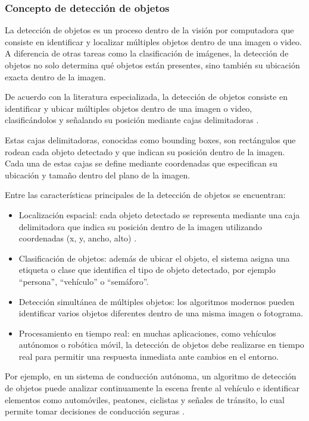 \subsubsection{Concepto de detección de objetos}
La detección de objetos es un proceso dentro de la visión por computadora que consiste en identificar y localizar múltiples objetos dentro de una imagen o video. A diferencia de otras tareas como la clasificación de imágenes, la detección de objetos no solo determina qué objetos están presentes, sino también su ubicación exacta dentro de la imagen.

De acuerdo con la literatura especializada, la detección de objetos consiste en identificar y ubicar múltiples objetos dentro de una imagen o video, clasificándolos y señalando su posición mediante cajas delimitadoras \cite{geeksforgeeks_object_detection}.

Estas cajas delimitadoras, conocidas como bounding boxes, son rectángulos que rodean cada objeto detectado y que indican su posición dentro de la imagen. Cada una de estas cajas se define mediante coordenadas que especifican su ubicación y tamaño dentro del plano de la imagen.

Entre las características principales de la detección de objetos se encuentran:
\begin{itemize}
    \item  Localización espacial: cada objeto detectado se representa mediante una caja delimitadora que indica su posición dentro de la imagen utilizando coordenadas (x, y, ancho, alto) \cite{geeksforgeeks_object_detection}.
    \item Clasificación de objetos: además de ubicar el objeto, el sistema asigna una etiqueta o clase que identifica el tipo de objeto detectado, por ejemplo “persona”, “vehículo” o “semáforo”.
    \item Detección simultánea de múltiples objetos: los algoritmos modernos pueden identificar varios objetos diferentes dentro de una misma imagen o fotograma.
    \item Procesamiento en tiempo real: en muchas aplicaciones, como vehículos autónomos o robótica móvil, la detección de objetos debe realizarse en tiempo real para permitir una respuesta inmediata ante cambios en el entorno.
\end{itemize}

Por ejemplo, en un sistema de conducción autónoma, un algoritmo de detección de objetos puede analizar continuamente la escena frente al vehículo e identificar elementos como automóviles, peatones, ciclistas y señales de tránsito, lo cual permite tomar decisiones de conducción seguras \cite{geeksforgeeks_object_detection}\cite{fvivas_guia_cv}.

